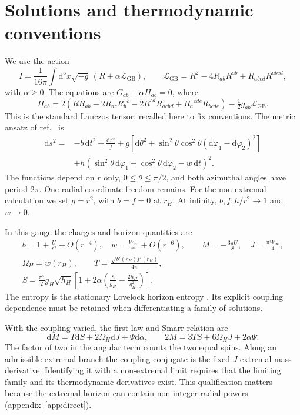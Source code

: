 \documentclass[11pt,a4paper]{article}
\newcommand{\dd}{\mathrm d}
\newcommand{\GB}{\mathrm{GB}}
\begin{document}
\section{Solutions and thermodynamic conventions}
\label{sec:setup}
We use the action
\begin{equation}
 I=\frac1{16\pi}\int\dd^5x\sqrt{-g}\,(R+\alpha\mathcal L_\GB),\qquad
 \mathcal L_\GB=R^2-4R_{ab}R^{ab}+R_{abcd}R^{abcd},
 \label{eq:action}
\end{equation}
with $\alpha\ge0$. The equations are $G_{ab}+\alpha H_{ab}=0$, where
\begin{equation}
 H_{ab}=2\left(RR_{ab}-2R_{ac}R_b{}^c-2R^{cd}R_{acbd}
                  +R_a{}^{cde}R_{bcde}\right)-\tfrac12g_{ab}\mathcal L_\GB.
\end{equation}
This is the standard Lanczos tensor, recalled here to fix conventions. The metric ansatz of ref.~\cite{Brihaye2010} is
\begin{align}
 \dd s^2={}&-b\,\dd t^2+\frac{\dd r^2}{f}
 +g\left[\dd\theta^2+\sin^2\theta\cos^2\theta(\dd\varphi_1-\dd\varphi_2)^2\right]
 \nonumber\\
 &+h\left(\sin^2\theta\,\dd\varphi_1+\cos^2\theta\,\dd\varphi_2-w\,\dd t\right)^2 .
 \label{eq:metric}
\end{align}
The functions depend on $r$ only, $0\le\theta\le\pi/2$, and both azimuthal angles have period $2\pi$. One radial coordinate freedom remains. For the non-extremal calculation we set $g=r^2$, with $b=f=0$ at $r_H$. At infinity, $b,f,h/r^2\to1$ and $w\to0$.

In this gauge the charges and horizon quantities are
\begin{gather}
 b=1+\frac{U}{r^2}+O(r^{-4}),\quad
 w=\frac{W_\infty}{r^4}+O(r^{-6}),\qquad
 M=-\frac{3\pi U}{8},\quad J=\frac{\pi W_\infty}{4},\label{eq:charges}\\
 \Omega_H=w(r_H),\qquad T=\frac{\sqrt{b'(r_H)f'(r_H)}}{4\pi},\\
 S=\frac{\pi^2}{2}g_H\sqrt{h_H}
 \left[1+2\alpha\left(\frac8{g_H}-\frac{2h_H}{g_H^2}\right)\right].
 \label{eq:entropy}
\end{gather}
The entropy is the stationary Lovelock horizon entropy \cite{Jacobson1993,Wald1993}. Its explicit coupling dependence must be retained when differentiating a family of solutions.

With the coupling varied, the first law and Smarr relation are \cite{Kastor2010,Neri2024}
\begin{equation}
 \dd M=T\dd S+2\Omega_H\dd J+\Psi\dd\alpha,\qquad
 2M=3TS+6\Omega_HJ+2\alpha\Psi.
 \label{eq:firstlaw}
\end{equation}
The factor of two in the angular term counts the two equal spins. Along an admissible extremal branch the coupling conjugate is the fixed-$J$ extremal mass derivative. Identifying it with a non-extremal limit requires that the limiting family and its thermodynamic derivatives exist. This qualification matters because the extremal horizon can contain non-integer radial powers (appendix~\ref{app:direct}).
\end{document}
